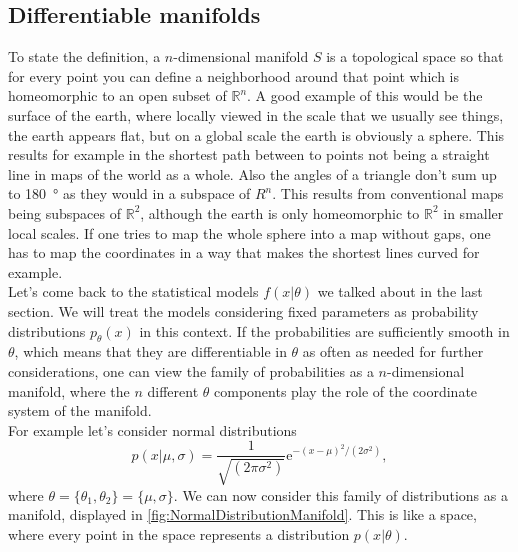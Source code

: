 \subsection{Differentiable manifolds}
To state the definition, a $n$-dimensional manifold $S$ is a topological space so that for every point you can define a neighborhood around that point which is homeomorphic to an open subset of $\mathbb{R}^n$. A good example of this would be the surface of the earth, where locally viewed in the scale that we usually see things, the earth appears flat, but on a global scale the earth is obviously a sphere. This results for example in the shortest path between to points not being a straight line in maps of the world as a whole. Also the angles of a triangle don't sum up to \SI{180}{\degree} as they would in a subspace of $R^n$. This results from conventional maps being subspaces of $\mathbb{R}^2$, although the earth is only homeomorphic to $\mathbb{R}^2$ in smaller local scales. If one tries to map the whole sphere into a map without gaps, one has to map the coordinates in a way that makes the shortest lines curved for example.\\
Let's come back to the statistical models $f(x|\theta)$ we talked about in the last section. We will treat the models considering fixed parameters as probability distributions $p_\theta(x)$ in this context. If the probabilities are sufficiently smooth in $\theta$, which means that they are differentiable in $\theta$ as often as needed for further considerations, one can view the family of probabilities as a $n$-dimensional manifold, where the $n$ different $\theta$ components play the role of the coordinate system of the manifold. \\
For example let's consider normal distributions 
\begin{equation}
	p(x|\mu,\sigma) = \frac{1}{\sqrt{(2\pi\sigma^2)}} \mathrm{e}^{-(x-\mu)^2/(2\sigma^2)},
\end{equation}
where $\theta = \{\theta_1,\theta_2\} = \{\mu,\sigma\}$. We can now consider this family of distributions as a manifold, displayed in \cref{fig:NormalDistributionManifold}. This is like a space, where every point in the space represents a distribution $p(x|\theta)$.

